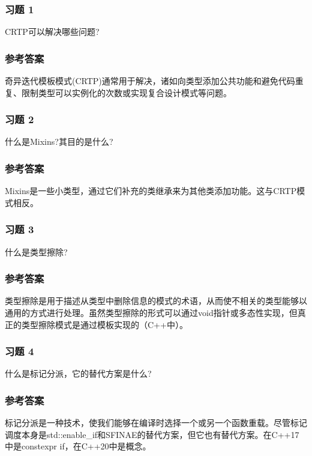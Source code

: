 \subsubsection{习题 1}

CRTP可以解决哪些问题?

\subsubsection{参考答案}

奇异迭代模板模式(CRTP)通常用于解决，诸如向类型添加公共功能和避免代码重复、限制类型可以实例化的次数或实现复合设计模式等问题。


\subsubsection{习题 2}

什么是Mixins?其目的是什么?

\subsubsection{参考答案}

Mixins是一些小类型，通过它们补充的类继承来为其他类添加功能。这与CRTP模式相反。

\subsubsection{习题 3}

什么是类型擦除?

\subsubsection{参考答案}

类型擦除是用于描述从类型中删除信息的模式的术语，从而使不相关的类型能够以通用的方式进行处理。虽然类型擦除的形式可以通过void指针或多态性实现，但真正的类型擦除模式是通过模板实现的（C++中）。

\subsubsection{习题 4}

什么是标记分派，它的替代方案是什么?

\subsubsection{参考答案}

标记分派是一种技术，使我们能够在编译时选择一个或另一个函数重载。尽管标记调度本身是std::enable\_if和SFINAE的替代方案，但它也有替代方案。在C++17中是constexpr if，在C++20中是概念。

